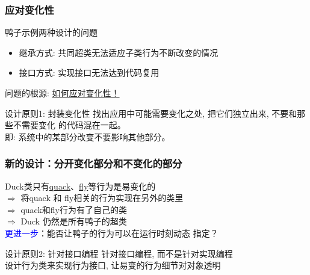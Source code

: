 \documentclass[compress]{beamer}
\begin{document}
\begin{frame}
  \frametitle{应对变化性}

  鸭子示例两种设计的问题
  \begin{itemize}
    \item 继承方式: 共同超类无法适应子类行为不断改变的情况
    \item 接口方式: 实现接口无法达到代码复用
  \end{itemize}

  \alert{问题的根源}: \uline{如何应对变化性！}\\[2ex]

  \begin{block}{设计原则1: 封装变化性}
    找出应用中可能需要变化之处, 把它们独立出来, 不要和那些不需要变化
    的代码混在一起。 \\
    即: 系统中的某部分改变不要影响其他部分。
  \end{block}

\end{frame}

\begin{frame}
  \frametitle{新的设计：分开变化部分和不变化的部分}

    Duck类只有\uline{quack}、\uline{fly}等行为是易变化的 \\
    \quad $\Longrightarrow$ 将quack 和 fly相关的行为实现在另外的类里 \\
    \qquad $\Longrightarrow$ quack和fly行为有了自己的类 \\
    \quad \qquad $\Longrightarrow$ Duck 仍然是所有鸭子的超类 \\[2ex]

    \textcolor{blue}{更进一步}：能否让鸭子的行为可以在运行时刻动态
    指定？ \\[2ex]

    \begin{block}{设计原则2: 针对接口编程}
      针对接口编程, 而不是针对实现编程 \\
      设计行为类来实现行为接口, 让易变的行为细节对对象透明
    \end{block}

\end{frame}
\end{document}
